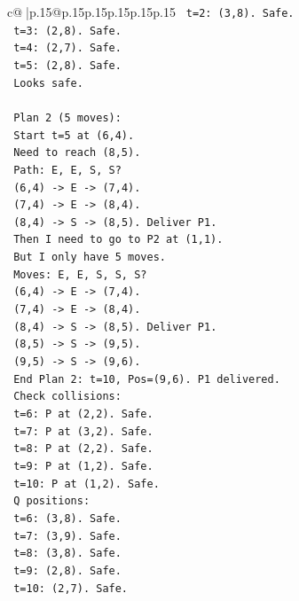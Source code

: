 \documentclass{article}
\begin{document}
{\begin{supertabular}{c@{$\;$}|p{.15\linewidth}@{}p{.15\linewidth}p{.15\linewidth}p{.15\linewidth}p{.15\linewidth}p{.15\linewidth}}
{{{\texttt{   t=2: (3,8). Safe.} \\
\texttt{   t=3: (2,8). Safe.} \\
\texttt{   t=4: (2,7). Safe.} \\
\texttt{   t=5: (2,8). Safe.} \\
\texttt{   Looks safe.} \\
\\ 
\texttt{   Plan 2 (5 moves):} \\
\texttt{   Start t=5 at (6,4).} \\
\texttt{   Need to reach (8,5).} \\
\texttt{   Path: E, E, S, S?} \\
\texttt{   (6,4) {-}> E {-}> (7,4).} \\
\texttt{   (7,4) {-}> E {-}> (8,4).} \\
\texttt{   (8,4) {-}> S {-}> (8,5). Deliver P1.} \\
\texttt{   Then I need to go to P2 at (1,1).} \\
\texttt{   But I only have 5 moves.} \\
\texttt{   Moves: E, E, S, S, S?} \\
\texttt{   (6,4) {-}> E {-}> (7,4).} \\
\texttt{   (7,4) {-}> E {-}> (8,4).} \\
\texttt{   (8,4) {-}> S {-}> (8,5). Deliver P1.} \\
\texttt{   (8,5) {-}> S {-}> (9,5).} \\
\texttt{   (9,5) {-}> S {-}> (9,6).} \\
\texttt{   End Plan 2: t=10, Pos=(9,6). P1 delivered.} \\
\texttt{   Check collisions:} \\
\texttt{   t=6: P at (2,2). Safe.} \\
\texttt{   t=7: P at (3,2). Safe.} \\
\texttt{   t=8: P at (2,2). Safe.} \\
\texttt{   t=9: P at (1,2). Safe.} \\
\texttt{   t=10: P at (1,2). Safe.} \\
\texttt{   Q positions:} \\
\texttt{   t=6: (3,8). Safe.} \\
\texttt{   t=7: (3,9). Safe.} \\
\texttt{   t=8: (3,8). Safe.} \\
\texttt{   t=9: (2,8). Safe.} \\
\texttt{   t=10: (2,7). Safe.} \\
}}}
\end{supertabular}}
\end{document}
